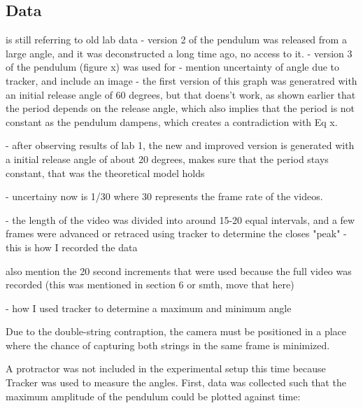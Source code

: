 \documentclass[12pt]{article}
\begin{document}
\subsection{Data}
{\color{blue}
is still referring to old lab data
- version 2 of the pendulum was released from a large angle, and it was deconstructed a long time ago, no access to it.
- version 3 of the pendulum (figure x) was used for
- mention uncertainty of angle due to tracker, and include an image
- the first version of this graph was generatred with an initial release angle of 60 degrees, but that doens't work, as shown earlier that the period depends on the release angle, which also implies that the period is not constant as the pendulum dampens, which creates a contradiction with Eq x.

- after observing results of lab 1,  the new and improved version is generated with a initial release angle of about 20 degrees, makes sure that the period stays constant, that was the theoretical model holds

- uncertainy now is 1/30 where 30 represents the frame rate of the videos.

- the length of the video was divided into around 15-20 equal intervals, and a few frames were advanced or retraced using tracker to determine the closes "peak"  - this is how I recorded the data

also mention the 20 second increments that were used because the full video was recorded (this was mentioned in section 6 or smth, move that here)

- how I used tracker to determine a maximum and minimum angle



}


Due to the double-string contraption, the camera must be positioned in a place where the chance of capturing both strings in the same frame is minimized.

A protractor was not included in the experimental setup this time because Tracker \cite{tracker} was used to measure the angles. First, data was collected such that the maximum amplitude of the pendulum could be plotted against time:
\end{document}

